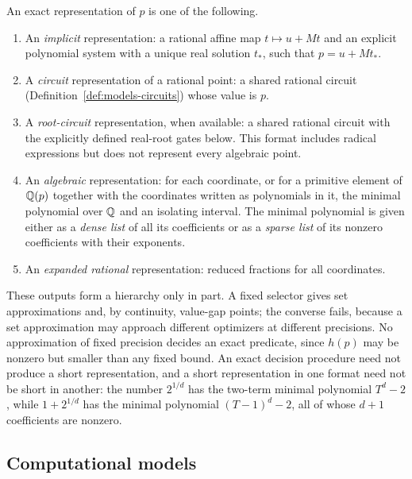 \begin{definition}
\label{def:models-representations}
An exact representation of $p$ is one of the following.
\begin{enumerate}[label=(\alph*)]
\item An \emph{implicit} representation: a rational affine map $t\mapsto u+Mt$
  and an explicit polynomial system with a unique real solution $t_*$, such
  that $p=u+Mt_*$.
\item A \emph{circuit} representation of a rational point: a shared rational
  circuit (Definition~\ref{def:models-circuits}) whose value is $p$.
\item A \emph{root-circuit} representation, when available: a shared rational
  circuit with the explicitly defined real-root gates below. This format
  includes radical expressions but does not represent every algebraic point.
\item An \emph{algebraic} representation: for each coordinate, or for a
  primitive element of $\mathbb Q(p)$ together with the coordinates written as
  polynomials in it, the minimal polynomial over $\mathbb Q$ and an isolating
  interval. The minimal polynomial is given either as a \emph{dense list} of
  all its coefficients or as a \emph{sparse list} of its nonzero coefficients
  with their exponents.
\item An \emph{expanded rational} representation: reduced fractions for all
  coordinates.
\end{enumerate}
\end{definition}

These outputs form a hierarchy only in part. A fixed selector gives set
approximations and, by continuity, value-gap points; the converse fails,
because a set approximation may approach different optimizers at different
precisions. No approximation of fixed precision decides an exact
predicate, since $h(p)$ may be nonzero but smaller than any fixed bound. An
exact decision procedure need not produce a short representation, and a
short representation in one format need not be short in another: the number
$2^{1/d}$ has the two-term minimal polynomial $T^d-2$, while $1+2^{1/d}$ has
the minimal polynomial $(T-1)^d-2$, all of whose $d+1$ coefficients are
nonzero.

\subsection{Computational models}
\label{sec:models-computation}

